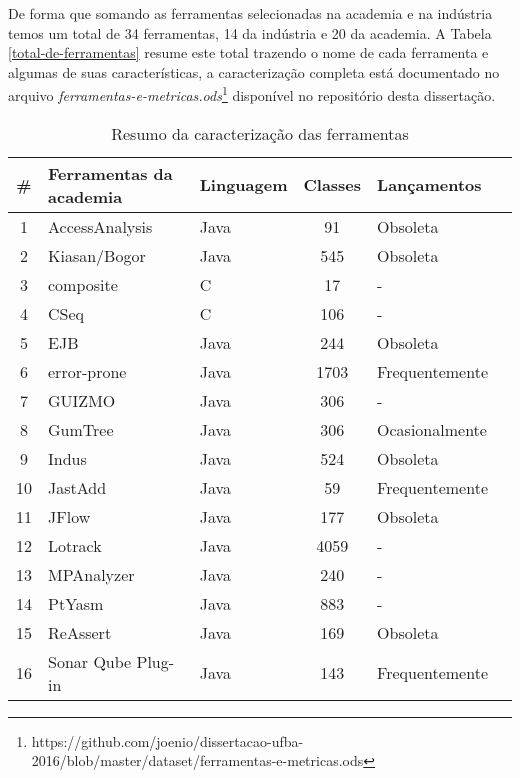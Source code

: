 De forma que somando as ferramentas selecionadas na academia e na indústria
temos um total de 34 ferramentas, 14 da indústria e 20 da academia.  A Tabela
\ref{total-de-ferramentas} resume este total trazendo o nome de cada ferramenta
e algumas de suas características, a caracterização completa está documentado
no arquivo {\it
ferramentas-e-metricas.ods}\footnote{https://github.com/joenio/dissertacao-ufba-2016/blob/master/dataset/ferramentas-e-metricas.ods}
disponível no repositório desta dissertação.

\begin{table}[H]
  \caption{Resumo da caracterização das ferramentas}
  \centering
  \begin{tabular}{| c | l | l | c | l | l |}
    \hline
    \#  & Ferramentas da academia & Linguagem & Classes & Lançamentos \\
    \hline
    1  & AccessAnalysis          & Java   & 91    & Obsoleta       \\
    2  & Kiasan/Bogor            & Java   & 545   & Obsoleta       \\
    3  & composite               & C      & 17    & -              \\
    4  & CSeq                    & C      & 106   & -              \\
    5  & EJB                     & Java   & 244   & Obsoleta       \\
    6  & error-prone             & Java   & 1703  & Frequentemente \\
    7  & GUIZMO                  & Java   & 306   & -              \\
    8  & GumTree                 & Java   & 306   & Ocasionalmente \\
    9  & Indus                   & Java   & 524   & Obsoleta       \\
    10 & JastAdd                 & Java   & 59    & Frequentemente \\
    11 & JFlow                   & Java   & 177   & Obsoleta       \\
    12 & Lotrack                 & Java   & 4059  & -              \\
    13 & MPAnalyzer              & Java   & 240   & -              \\
    14 & PtYasm                  & Java   & 883   & -              \\
    15 & ReAssert                & Java   & 169   & Obsoleta       \\
    16 & Sonar Qube Plug-in      & Java   & 143   & Frequentemente \\

\end{tabular}
\end{table}
